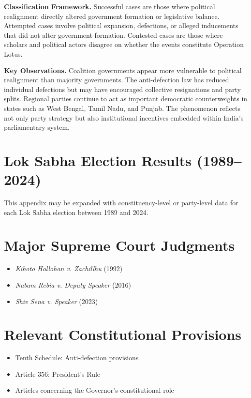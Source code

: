 \documentclass[11pt]{article}
\begin{document}
\textbf{Classification Framework.} Successful cases are those where political realignment directly altered government formation or legislative balance. Attempted cases involve political expansion, defections, or alleged inducements that did not alter government formation. Contested cases are those where scholars and political actors disagree on whether the events constitute Operation Lotus.

\textbf{Key Observations.} Coalition governments appear more vulnerable to political realignment than majority governments. The anti-defection law has reduced individual defections but may have encouraged collective resignations and party splits. Regional parties continue to act as important democratic counterweights in states such as West Bengal, Tamil Nadu, and Punjab. The phenomenon reflects not only party strategy but also institutional incentives embedded within India's parliamentary system.

\section{Lok Sabha Election Results (1989--2024)}
This appendix may be expanded with constituency-level or party-level data for each Lok Sabha election between 1989 and 2024.

\section{Major Supreme Court Judgments}
\begin{itemize}
\item \emph{Kihoto Hollohan v. Zachillhu} (1992)
\item \emph{Nabam Rebia v. Deputy Speaker} (2016)
\item \emph{Shiv Sena v. Speaker} (2023)
\end{itemize}

\section{Relevant Constitutional Provisions}
\begin{itemize}
\item Tenth Schedule: Anti-defection provisions
\item Article 356: President's Rule
\item Articles concerning the Governor's constitutional role
\end{itemize}
\end{document}
